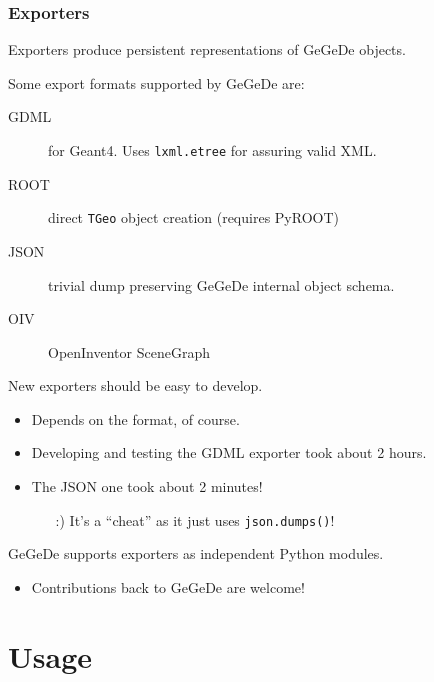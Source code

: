 \documentclass[10pt,xcolor=dvipsnames]{beamer}
\begin{document}
\begin{frame}
  \frametitle{Exporters}

  Exporters produce persistent representations of GeGeDe objects.

  \vspace{5mm}

  Some export formats supported by GeGeDe are:

  \begin{description}
  \item[GDML] for Geant4.  Uses \texttt{lxml.etree} for assuring valid XML.
  \item[ROOT] direct \texttt{TGeo} object creation (requires PyROOT)
  \item[JSON] trivial dump preserving GeGeDe internal object schema.
  \item[OIV] OpenInventor SceneGraph 
  \end{description}

  \vfill

  New exporters should be easy to develop.
  \begin{itemize}\footnotesize
  \item Depends on the format, of course.
  \item Developing and testing the GDML exporter took about 2 hours.
  \item The JSON one took about 2 minutes! 
    \begin{itemize}\tiny
    \item[:)] It's a ``cheat'' as it just uses \texttt{json.dumps()}!
    \end{itemize}
  \end{itemize}

  \vfill

  GeGeDe supports exporters as independent Python modules.
  \begin{itemize}\footnotesize
  \item Contributions back to GeGeDe are welcome!
  \end{itemize}
\end{frame}

\section{Usage}
\begin{frame}
\end{frame}
\end{document}
